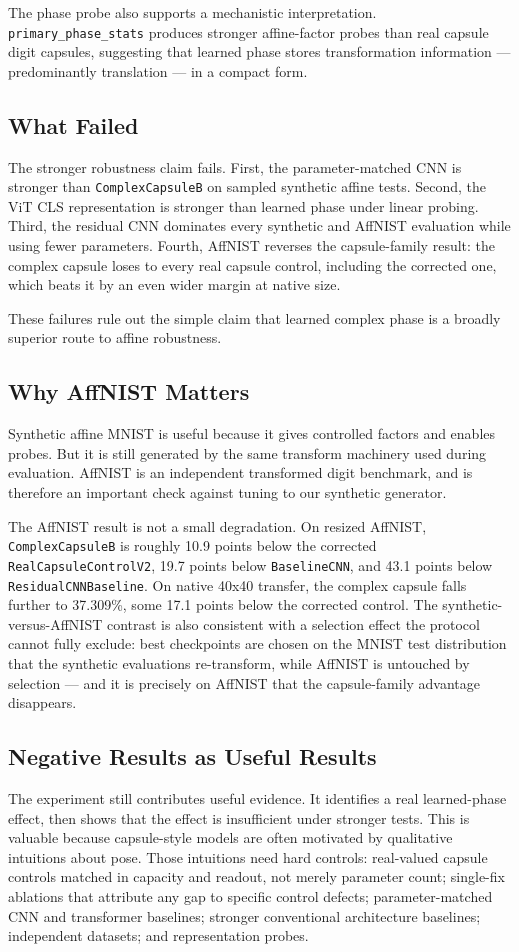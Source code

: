\documentclass[11pt]{article}
\begin{document}
The phase probe also supports a mechanistic interpretation. \texttt{primary\_phase\_stats} produces stronger affine-factor probes than real capsule digit capsules, suggesting that learned phase stores transformation information --- predominantly translation --- in a compact form.

\subsection{What Failed}
The stronger robustness claim fails. First, the parameter-matched CNN is stronger than \texttt{ComplexCapsuleB} on sampled synthetic affine tests. Second, the ViT CLS representation is stronger than learned phase under linear probing. Third, the residual CNN dominates every synthetic and AffNIST evaluation while using fewer parameters. Fourth, AffNIST reverses the capsule-family result: the complex capsule loses to every real capsule control, including the corrected one, which beats it by an even wider margin at native size.

These failures rule out the simple claim that learned complex phase is a broadly superior route to affine robustness.

\subsection{Why AffNIST Matters}
Synthetic affine MNIST is useful because it gives controlled factors and enables probes. But it is still generated by the same transform machinery used during evaluation. AffNIST is an independent transformed digit benchmark, and is therefore an important check against tuning to our synthetic generator.

The AffNIST result is not a small degradation. On resized AffNIST, \texttt{ComplexCapsuleB} is roughly 10.9 points below the corrected \texttt{RealCapsuleControlV2}, 19.7 points below \texttt{BaselineCNN}, and 43.1 points below \texttt{ResidualCNNBaseline}. On native 40x40 transfer, the complex capsule falls further to 37.309\%, some 17.1 points below the corrected control. The synthetic-versus-AffNIST contrast is also consistent with a selection effect the protocol cannot fully exclude: best checkpoints are chosen on the MNIST test distribution that the synthetic evaluations re-transform, while AffNIST is untouched by selection --- and it is precisely on AffNIST that the capsule-family advantage disappears.

\subsection{Negative Results as Useful Results}
The experiment still contributes useful evidence. It identifies a real learned-phase effect, then shows that the effect is insufficient under stronger tests. This is valuable because capsule-style models are often motivated by qualitative intuitions about pose. Those intuitions need hard controls: real-valued capsule controls matched in capacity and readout, not merely parameter count; single-fix ablations that attribute any gap to specific control defects; parameter-matched CNN and transformer baselines; stronger conventional architecture baselines; independent datasets; and representation probes.
\end{document}
